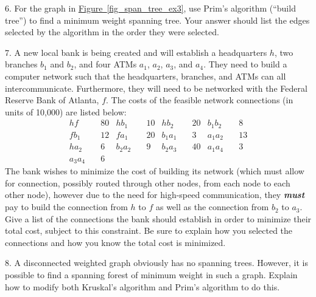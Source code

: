 \documentclass[10pt,]{book}
\newcommand{\alert}[1]{\textbf{\textit{#1}}}
\theoremstyle{plain}
\theoremstyle{definition}
\theoremstyle{definition}
\theoremstyle{definition}
\theoremstyle{definition}
\numberwithin{equation}{section}
\newcommand{\amp}{&}
\begin{document}
\begin{exerciselist}
\begin{figure}
\end{figure}
\par\smallskip
\item[6.]\hypertarget{exercise-18}{}\hypertarget{p-251}{}%
For the graph in \hyperref[fig_span_tree_ex3]{Figure~\ref{fig_span_tree_ex3}}, use Prim's algorithm (``build tree'') to find a minimum weight spanning tree. Your answer should list the edges selected by the algorithm in the order they were selected.%
\par\smallskip
\item[7.]\hypertarget{exercise-19}{}\hypertarget{p-252}{}%
A new local bank is being created and will establish a headquarters \(h\), two branches \(b_1\) and \(b_2\), and four ATMs \(a_1\), \(a_2\), \(a_3\), and \(a_4\). They need to build a computer network such that the headquarters, branches, and ATMs can all intercommunicate. Furthermore, they will need to be networked with the Federal Reserve Bank of Atlanta, \(f\). The costs of the feasible network connections (in units of \textdollar{}10,000) are listed below:%
\begin{align*}
h f \amp  \quad 80 \amp 
h b_1 \amp  \quad 10\amp  h b_2 \amp  \quad 20\amp 
b_1 b_2 \amp  \quad 8\\
f b_1 \amp  \quad 12\amp 
f a_1 \amp  \quad 20\amp  b_1 a_1 \amp  \quad 3\amp 
a_1 a_2 \amp  \quad 13\\
h a_2 \amp  \quad 6\amp 
b_2 a_2 \amp  \quad 9\amp  b_2 a_3 \amp  \quad 40\amp 
a_1 a_4 \amp  \quad 3\\
a_3 a_4 \amp \quad 6
\end{align*}
The bank wishes to minimize the cost of building its network (which must allow for connection, possibly routed through other nodes, from each node to each other node), however due to the need for high-speed communication, they \alert{must} pay to build the connection from \(h\) to \(f\) as well as the connection from \(b_2\) to \(a_3\). Give a list of the connections the bank should establish in order to minimize their total cost, subject to this constraint. Be sure to explain how you selected the connections and how you know the total cost is minimized.%
\par\smallskip
\item[8.]\hypertarget{exercise-20}{}\hypertarget{p-253}{}%
A disconnected weighted graph obviously has no spanning trees. However, it is possible to find a spanning forest of minimum weight in such a graph. Explain how to modify both Kruskal's algorithm and Prim's algorithm to do this.%
\par\smallskip

\end{exerciselist}
\end{document}
